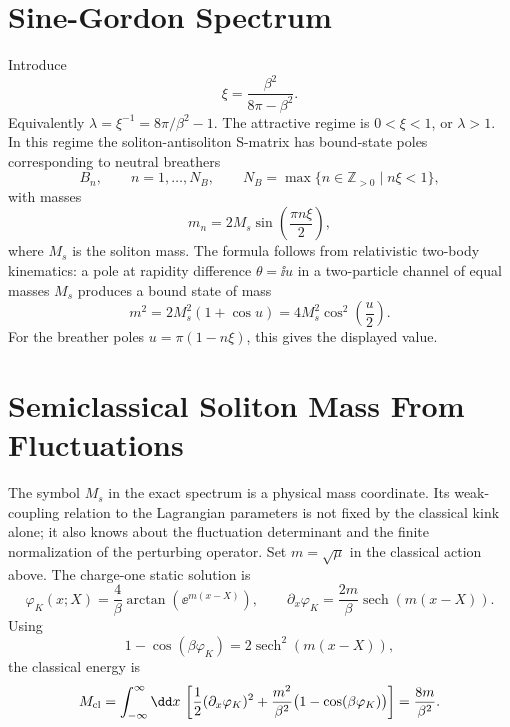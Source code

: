 \section{Sine-Gordon Spectrum}

Introduce
\[
  \xi=\frac{\beta^2}{8\pi-\beta^2}.
\]
Equivalently \(\lambda=\xi^{-1}=8\pi/\beta^2-1\).  The attractive regime is
\(0<\xi<1\), or \(\lambda>1\).  In this regime the soliton-antisoliton
S-matrix has bound-state poles corresponding to neutral breathers
\[
  B_n,\qquad
  n=1,\ldots,N_B,\qquad
  N_B=\max\{n\in\mathbb Z_{>0}\mid n\xi<1\},
\]
with masses
\[
  m_n=2M_s\sin\!\left(\frac{\pi n\xi}{2}\right),
\]
where \(M_s\) is the soliton mass.  The formula follows from relativistic
two-body kinematics: a pole at rapidity difference \(\theta=\ii u\) in a
two-particle channel of equal masses \(M_s\) produces a bound state of mass
\[
  m^2=2M_s^2(1+\cos u)
  =
  4M_s^2\cos^2\!\left(\frac{u}{2}\right).
\]
For the breather poles \(u=\pi(1-n\xi)\), this gives the displayed value.

\section{Semiclassical Soliton Mass From Fluctuations}
\label{sec:sine-gordon-dhn-soliton-mass}

The symbol \(M_s\) in the exact spectrum is a physical mass coordinate.  Its
weak-coupling relation to the Lagrangian parameters is not fixed by the
classical kink alone; it also knows about the fluctuation determinant and the
finite normalization of the perturbing operator.  Set \(m=\sqrt{\mu}\) in the
classical action above.  The charge-one static solution is
\begin{equation}
  \varphi_K(x;X)
  =
  \frac4\beta\arctan\!\left(\ee^{m(x-X)}\right),
  \qquad
  \partial_x\varphi_K
  =
  \frac{2m}{\beta}\operatorname{sech}(m(x-X)).
  \label{eq:sine-gordon-classical-kink-profile}
\end{equation}
Using
\[
  1-\cos(\beta\varphi_K)=2\operatorname{sech}^2(m(x-X)),
\]
the classical energy is
\begin{equation}
  M_{\rm cl}
  =
  \int_{-\infty}^{\infty}\dd x\,
  \left[
    \frac12(\partial_x\varphi_K)^2
    +\frac{m^2}{\beta^2}
      \bigl(1-\cos(\beta\varphi_K)\bigr)
  \right]
  =
  \frac{8m}{\beta^2}.
  \label{eq:sine-gordon-classical-kink-mass}
\end{equation}


